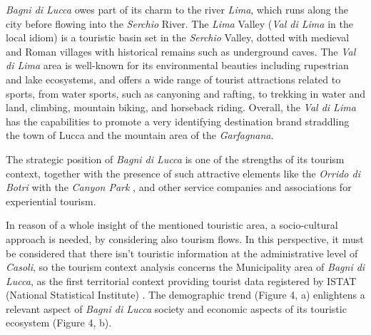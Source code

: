 \documentclass[sustainability,article,submit,pdftex,moreauthors]{Definitions/mdpi}
\begin{document}
\emph{Bagni di Lucca} owes part of its charm to the river \emph{Lima}, which runs along the city before flowing into the \textit{Serchio} River. The \emph{Lima} Valley (\emph {Val di Lima} in the local idiom) is a touristic basin set in the \textit{Serchio} Valley, dotted with medieval and Roman villages with historical remains such as underground caves. The \emph{Val di Lima} area is well-known for its environmental beauties including rupestrian and lake ecosystems, and offers a wide range of tourist attractions related to sports, from water sports, such as canyoning and rafting, to trekking in water and land, climbing, mountain biking, and horseback riding. Overall, the \emph{Val di Lima} has the capabilities to promote a very identifying destination brand straddling the town of Lucca and the mountain area of the \textit{Garfagnana}.

The strategic position of \emph{Bagni di Lucca} is one of the strengths of its tourism context, together with the presence of such attractive elements like the \emph{Orrido di Botri}  with the \emph{Canyon Park} , and other service companies and associations for experiential tourism.

In reason of a whole insight of the mentioned touristic area, a socio-cultural approach is needed, by considering also tourism flows. In this perspective, it must be considered that there isn’t touristic information at the administrative level of \emph{Casoli}, so the tourism context analysis concerns the Municipality area of \emph{Bagni di Lucca}, as the first territorial context providing tourist data registered by ISTAT (National Statistical Institute) .
 The demographic trend (Figure 4, a) enlightens a relevant aspect of \emph{Bagni di Lucca} society and economic aspects of its touristic ecosystem (Figure 4, b).
\end{document}
